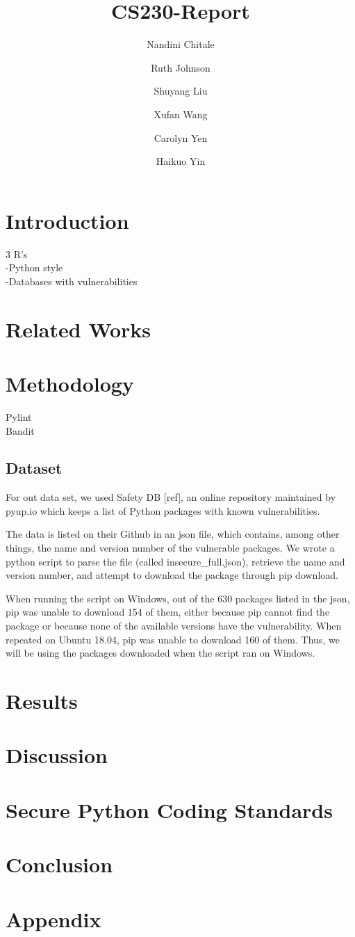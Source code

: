 \documentclass[acmlarge]{acmart}
\title{CS230-Report}
\author{Nandini Chitale}
\author{Ruth Johnson}
\author{Shuyang Liu}
\author{Xufan Wang}
\author{Carolyn Yen}
\author{Haikuo Yin}
\begin{document}
\maketitle

\begin{abstract}
      
\end{abstract}
\section{Introduction}
3 R's\\
-Python style\\
-Databases with vulnerabilities\\
\section{Related Works}

\section{Methodology}
Pylint\\
Bandit\\
\subsection{Dataset}
For out data set, we used Safety DB [ref], an online repository maintained by pyup.io which keeps a list of Python packages with known vulnerabilities. 

The data is listed on their Github in an json file, which contains, among other things, the name and version number of the vulnerable packages. We wrote a python script to parse the file (called insecure\_full.json), retrieve the name and version number, and attempt to download the package through pip download.

When running the script on Windows, out of the 630 packages listed in the json, pip was unable to download 154 of them, either because pip cannot find the package or because none of the available versions have the vulnerability. When repeated on Ubuntu 18.04, pip was unable to download 160 of them. Thus, we will be using the packages downloaded when the script ran on Windows.

\section{Results}

\section{Discussion}

\section{Secure Python Coding Standards}

\section{Conclusion}

\section{Appendix}



\end{document}
